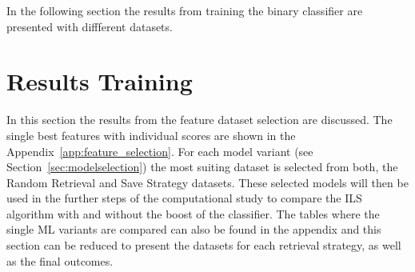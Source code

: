 In the following section the results from training the binary classifier are presented with diffferent datasets.

\section{Results Training}
\label{sec:ResultsTraining}
In this section the results from the feature dataset selection are discussed. The single best features
with individual scores are shown in the Appendix~\ref{app:feature_selection}. For each model variant (see Section~\ref{sec:modelselection})
the most suiting dataset is selected from both, the Random Retrieval and Save Strategy datasets. These selected
models will then be used in the further steps of the computational study to compare the \gls{ILS} algorithm
with and without the boost of the classifier. The tables where the single \gls{ML} variants are compared
can also be found in the appendix and this section can be reduced to present the datasets for each
retrieval strategy, as well as the final outcomes.

